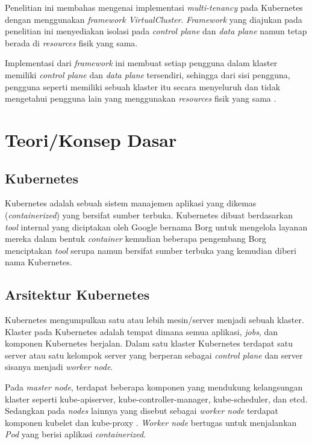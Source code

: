 Penelitian ini membahas mengenai implementasi \emph{multi-tenancy} pada
Kubernetes dengan menggunakan \emph{framework VirtualCluster}. \emph{Framework}
yang diajukan pada penelitian ini menyediakan isolasi pada \emph{control plane}
dan \emph{data plane} namun tetap berada di \emph{resources} fisik yang sama.

Implementasi dari \emph{framework} ini membuat setiap pengguna dalam klaster
memiliki \emph{control plane} dan \emph{data plane} tersendiri, sehingga dari
sisi pengguna, pengguna seperti memiliki sebuah klaster itu secara menyeluruh
dan tidak mengetahui pengguna lain yang menggunakan \emph{resources} fisik yang sama
\parencite{9546524}.

\section{Teori/Konsep Dasar}

\subsection{Kubernetes}

Kubernetes adalah sebuah sistem manajemen aplikasi yang dikemas (\emph{containerized})
yang bersifat sumber terbuka. Kubernetes dibuat berdasarkan \emph{tool} internal
yang diciptakan oleh Google bernama Borg untuk mengelola layanan mereka dalam bentuk
\emph{container} \parencite{43438} kemudian beberapa pengembang Borg menciptakan
\emph{tool} serupa namun bersifat sumber terbuka yang kemudian diberi nama Kubernetes.

\subsection{Arsitektur Kubernetes}

Kubernetes mengumpulkan satu atau lebih mesin/server menjadi sebuah klaster. Klaster
pada Kubernetes adalah tempat dimana semua aplikasi, \emph{jobs}, dan komponen Kubernetes
berjalan. Dalam satu klaster Kubernetes terdapat satu server atau satu kelompok server
yang berperan sebagai \emph{control plane} dan server sisanya menjadi \emph{worker node}.

Pada \emph{master node}, terdapat beberapa komponen yang mendukung kelangsungan
klaster seperti kube-apiserver, kube-controller-manager, kube-scheduler, dan etcd.
Sedangkan pada \emph{nodes} lainnya yang disebut sebagai \emph{worker node}
terdapat komponen kubelet dan kube-proxy \parencite{kubernetes-website-components}.
\emph{Worker node} bertugas untuk menjalankan \emph{Pod} yang berisi aplikasi
\emph{containerized}.

